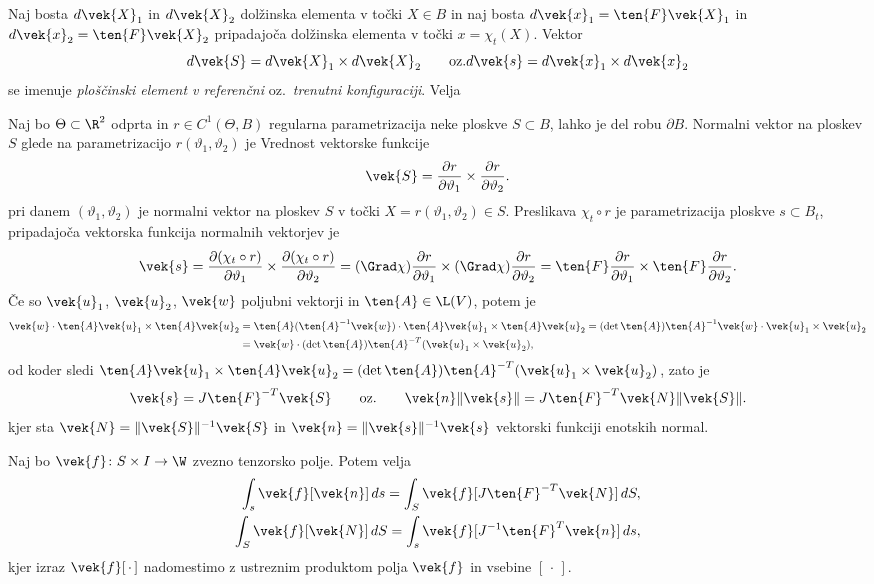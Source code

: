Naj bosta $d\vek{X}_1$ in $d\vek{X}_2$ dolžinska elementa v točki $X\in B$ in
naj bosta $d\vek{x}_1=\ten{F}\vek{X}_1$ in $d\vek{x}_2=\ten{F}\vek{X}_2$ pripadajoča
dolžinska elementa v točki $x=\chi_t(X)$. Vektor
\[
	d\vek{S}=d\vek{X}_1\times d\vek{X}_2\qquad\textrm{oz.}
	d\vek{s}=d\vek{x}_1\times d\vek{x}_2
\]
se imenuje \emph{ploščinski element v referenčni} oz.~\emph{trenutni konfiguraciji}.
Velja

Naj bo $\Theta\subset\R^2$ odprta in $r\in C^1(\Theta,B)$ regularna parametrizacija
neke ploskve $S\subset B$, lahko je del robu $\partial B$. Normalni vektor
na ploskev $S$ glede na parametrizacijo $r(\vartheta_1,\vartheta_2)$ je
Vrednost vektorske funkcije
\[
	\vek{S}=\frac{\partial r}{\partial\vartheta_1}\times
	\frac{\partial r}{\partial\vartheta_2}.
\]
pri danem $(\vartheta_1,\vartheta_2)$ je normalni vektor na ploskev $S$
v točki $X=r(\vartheta_1,\vartheta_2)\in S$.
Preslikava $\chi_t\circ r$ je parametrizacija ploskve $s\subset B_t$, pripadajoča
vektorska funkcija normalnih vektorjev je
\[
	\vek{s}=\frac{\partial(\chi_t\circ r)}{\partial\vartheta_1}\times
	\frac{\partial(\chi_t\circ r)}{\partial\vartheta_2}=
	(\Grad\chi)\frac{\partial r}{\partial\vartheta_1}\times
	(\Grad\chi)\frac{\partial r}{\partial\vartheta_2}=
	\ten{F}\frac{\partial r}{\partial\vartheta_1}\times
	\ten{F}\frac{\partial r}{\partial\vartheta_2}.
\]
Če so $\vek{u}_1$, $\vek{u}_2$, $\vek{w}$ poljubni vektorji in $\ten{A}\in\L(V)$, potem je
\begin{align*}
	\vek{w}\cdot\ten{A}\vek{u}_1\times\ten{A}\vek{u}_2&=
	\ten{A}(\ten{A}^{-1}\vek{w})\cdot\ten{A}\vek{u}_1\times\ten{A}\vek{u}_2=
	(\det\ten{A})\ten{A}^{-1}\vek{w}\cdot\vek{u}_1\times\vek{u}_2 \\
	&=\vek{w}\cdot (\det\ten{A})\ten{A}^{-T}(\vek{u}_1\times\vek{u}_2),
\end{align*}
od koder sledi $\ten{A}\vek{u}_1\times\ten{A}\vek{u}_2=
(\det\ten{A})\ten{A}^{-T}(\vek{u}_1\times\vek{u}_2)$, zato je
\begin{equation} \label{e:nsns}
	\vek{s}=J\ten{F}^{-T}\vek{S}\qquad\textrm{oz.}\qquad
	\vek{n}\|\vek{s}\|=J\ten{F}^{-T}\vek{N}\|\vek{S}\|.
\end{equation}
kjer sta $\vek{N}=\|\vek{S}\|^{-1}\vek{S}$ in $\vek{n}=\|\vek{s}\|^{-1}\vek{s}$
vektorski funkciji enotskih normal.

\begin{izrek}
	Naj bo $\vek{f}\colon S\times I\to\W$ zvezno tenzorsko polje. Potem velja
	\begin{align*}
		\int_s\vek{f}[\vek{n}]\,ds=\int_S\vek{f}[J\ten{F}^{-T}\vek{N}]\,dS ,\\
		\int_S\vek{f}[\vek{N}]\,dS=\int_s\vek{f}[J^{-1}\ten{F}^{T}\vek{n}]\,ds,
	\end{align*}
	kjer izraz $\vek{f}[\,\cdot\,]$ nadomestimo z ustreznim produktom
	polja $\vek{f}$ in vsebine $[\,\cdot\,]$.
\end{izrek}

